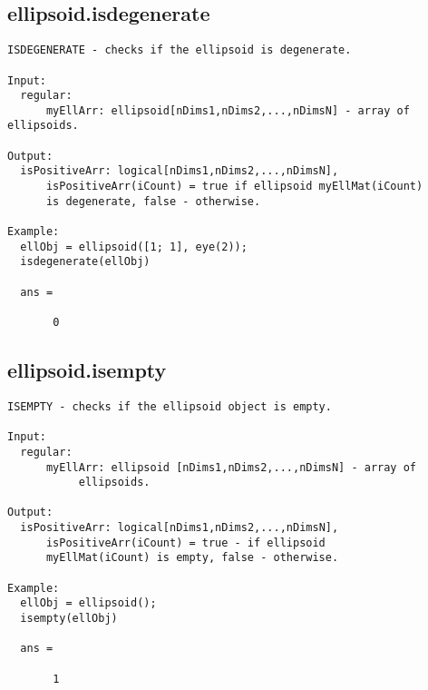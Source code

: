 \subsection{\texorpdfstring{ellipsoid.isdegenerate}{isdegenerate}}\label{method:ellipsoid.isdegenerate}
\begin{verbatim}
ISDEGENERATE - checks if the ellipsoid is degenerate.

Input:
  regular:
      myEllArr: ellipsoid[nDims1,nDims2,...,nDimsN] - array of ellipsoids.

Output:
  isPositiveArr: logical[nDims1,nDims2,...,nDimsN],
      isPositiveArr(iCount) = true if ellipsoid myEllMat(iCount)
      is degenerate, false - otherwise.

Example:
  ellObj = ellipsoid([1; 1], eye(2));
  isdegenerate(ellObj)

  ans =

       0
\end{verbatim}
\subsection{\texorpdfstring{ellipsoid.isempty}{isempty}}\label{method:ellipsoid.isempty}
\begin{verbatim}
ISEMPTY - checks if the ellipsoid object is empty.

Input:
  regular:
      myEllArr: ellipsoid [nDims1,nDims2,...,nDimsN] - array of
           ellipsoids.

Output:
  isPositiveArr: logical[nDims1,nDims2,...,nDimsN],
      isPositiveArr(iCount) = true - if ellipsoid
      myEllMat(iCount) is empty, false - otherwise.

Example:
  ellObj = ellipsoid();
  isempty(ellObj)

  ans =

       1
\end{verbatim}
